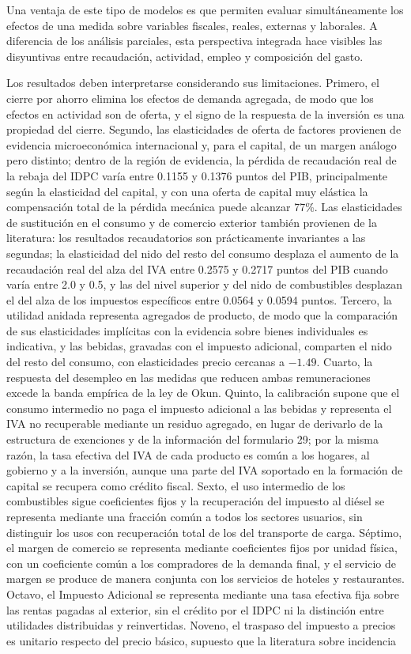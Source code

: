 \documentclass[11pt]{article}
\begin{document}
Una ventaja de este tipo de modelos es que permiten evaluar simultáneamente los efectos de una medida sobre variables fiscales, reales, externas y laborales. A diferencia de los análisis parciales, esta perspectiva integrada hace visibles las disyuntivas entre recaudación, actividad, empleo y composición del gasto.

Los resultados deben interpretarse considerando sus limitaciones. Primero, el cierre por ahorro elimina los efectos de demanda agregada, de modo que los efectos en actividad son de oferta, y el signo de la respuesta de la inversión es una propiedad del cierre. Segundo, las elasticidades de oferta de factores provienen de evidencia microeconómica internacional y, para el capital, de un margen análogo pero distinto; dentro de la región de evidencia, la pérdida de recaudación real de la rebaja del IDPC varía entre 0.1155 y 0.1376 puntos del PIB, principalmente según la elasticidad del capital, y con una oferta de capital muy elástica la compensación total de la pérdida mecánica puede alcanzar 77\%. Las elasticidades de sustitución en el consumo y de comercio exterior también provienen de la literatura: los resultados recaudatorios son prácticamente invariantes a las segundas; la elasticidad del nido del resto del consumo desplaza el aumento de la recaudación real del alza del IVA entre 0.2575 y 0.2717 puntos del PIB cuando varía entre 2.0 y 0.5, y las del nivel superior y del nido de combustibles desplazan el del alza de los impuestos específicos entre 0.0564 y 0.0594 puntos. Tercero, la utilidad anidada representa agregados de producto, de modo que la comparación de sus elasticidades implícitas con la evidencia sobre bienes individuales es indicativa, y las bebidas, gravadas con el impuesto adicional, comparten el nido del resto del consumo, con elasticidades precio cercanas a $-1.49$. Cuarto, la respuesta del desempleo en las medidas que reducen ambas remuneraciones excede la banda empírica de la ley de Okun. Quinto, la calibración supone que el consumo intermedio no paga el impuesto adicional a las bebidas y representa el IVA no recuperable mediante un residuo agregado, en lugar de derivarlo de la estructura de exenciones y de la información del formulario 29; por la misma razón, la tasa efectiva del IVA de cada producto es común a los hogares, al gobierno y a la inversión, aunque una parte del IVA soportado en la formación de capital se recupera como crédito fiscal. Sexto, el uso intermedio de los combustibles sigue coeficientes fijos y la recuperación del impuesto al diésel se representa mediante una fracción común a todos los sectores usuarios, sin distinguir los usos con recuperación total de los del transporte de carga. Séptimo, el margen de comercio se representa mediante coeficientes fijos por unidad física, con un coeficiente común a los compradores de la demanda final, y el servicio de margen se produce de manera conjunta con los servicios de hoteles y restaurantes. Octavo, el Impuesto Adicional se representa mediante una tasa efectiva fija sobre las rentas pagadas al exterior, sin el crédito por el IDPC ni la distinción entre utilidades distribuidas y reinvertidas. Noveno, el traspaso del impuesto a precios es unitario respecto del precio básico, supuesto que la literatura sobre incidencia 
\end{document}
